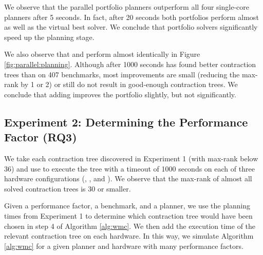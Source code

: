 
%


We observe that the parallel portfolio planners outperform all four single-core planners after 5 seconds. In fact, after 20 seconds both portfolios perform almost as well as the virtual best solver. We conclude that portfolio solvers significantly speed up the planning stage.

We also observe that  and  perform almost identically in Figure \ref{fig:parallel:planning}. Although after 1000 seconds  has found better contraction trees than  on 407 benchmarks, most improvements are small (reducing the max-rank by 1 or 2) or still do not result in good-enough contraction trees. We conclude that adding  improves the portfolio slightly, but not significantly.
 
\subsection{Experiment 2: Determining the Performance Factor (RQ3)}
\label{sec:experiments:pf}
We take each contraction tree discovered in Experiment 1 (with max-rank below 36) and use  to execute the tree with a timeout of 1000 seconds on each of three hardware configurations (, , and ). We observe that the max-rank of almost all solved contraction trees is 30 or smaller.

Given a performance factor, a benchmark, and a planner, we use the planning times from Experiment 1 to determine which contraction tree would have been chosen in step 4 of Algorithm \ref{alg:wmc}. We then add the execution time of the relevant contraction tree on each hardware. In this way, we simulate Algorithm \ref{alg:wmc} for a given planner and hardware with many performance factors. 

